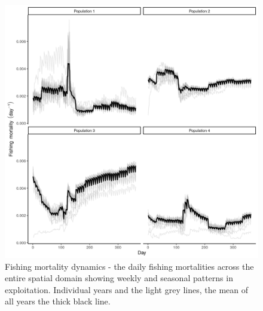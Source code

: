 \documentclass[review]{elsarticle}
\begin{document}
\begin{figure}[!ht]
	\includegraphics[width = \linewidth]{Plots/f_dynamics}
	\caption{Fishing mortality dynamics - the daily fishing mortalities
		across the entire spatial domain showing weekly and seasonal
		patterns in exploitation.  Individual years and the light grey
		lines, the mean of all years the thick black line.}
	\label{fig:10}
\end{figure}	
\end{document}
